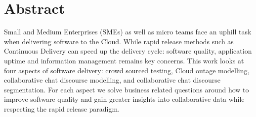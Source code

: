 

\chapter*{Abstract}

Small and Medium Enterprises (SMEs) as well as micro teams face an uphill task when delivering software to the Cloud. While rapid release methods such as Continuous Delivery can speed up the delivery cycle: software quality, application uptime and information management remains key concerns. This work looks at four aspects of software delivery: crowd sourced testing, Cloud outage modelling, collaborative chat discourse modelling, and collaborative chat discourse segmentation. For each aspect we solve business related questions around how to improve software quality and gain greater insights into collaborative data while respecting the rapid release paradigm.
\newpage


